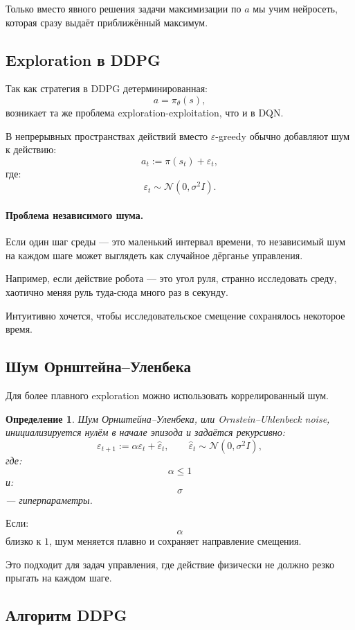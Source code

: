 \documentclass[12pt,a4paper]{article}
\newtheorem{definition}{Определение}
\begin{document}
Только вместо явного решения задачи максимизации по $a$ мы учим нейросеть, которая сразу выдаёт приближённый максимум.

\subsection{Exploration в DDPG}

Так как стратегия в DDPG детерминированная:
\[
a=\pi_\theta(s),
\]
возникает та же проблема exploration-exploitation, что и в DQN.

В непрерывных пространствах действий вместо $\varepsilon$-greedy обычно добавляют шум к действию:
\[
a_t
:=
\pi(s_t)+\varepsilon_t,
\]
где:
\[
\varepsilon_t
\sim
\mathcal N(0,\sigma^2 I).
\]

\paragraph{Проблема независимого шума.}

Если один шаг среды --- это маленький интервал времени, то независимый шум на каждом шаге может выглядеть как случайное дёрганье управления.

Например, если действие робота --- это угол руля, странно исследовать среду, хаотично меняя руль туда-сюда много раз в секунду.

Интуитивно хочется, чтобы исследовательское смещение сохранялось некоторое время.

\subsection{Шум Орнштейна--Уленбека}

Для более плавного exploration можно использовать коррелированный шум.

\begin{definition}
Шум Орнштейна--Уленбека, или Ornstein--Uhlenbeck noise, инициализируется нулём в начале эпизода и задаётся рекурсивно:
\[
\varepsilon_{t+1}
:=
\alpha\varepsilon_t
+
\hat\varepsilon_t,
\qquad
\hat\varepsilon_t
\sim
\mathcal N(0,\sigma^2 I),
\]
где:
\[
\alpha\le 1
\]
и:
\[
\sigma
\]
--- гиперпараметры.
\end{definition}

Если:
\[
\alpha
\]
близко к $1$, шум меняется плавно и сохраняет направление смещения.

Это подходит для задач управления, где действие физически не должно резко прыгать на каждом шаге.

\subsection{Алгоритм DDPG}
\end{document}
